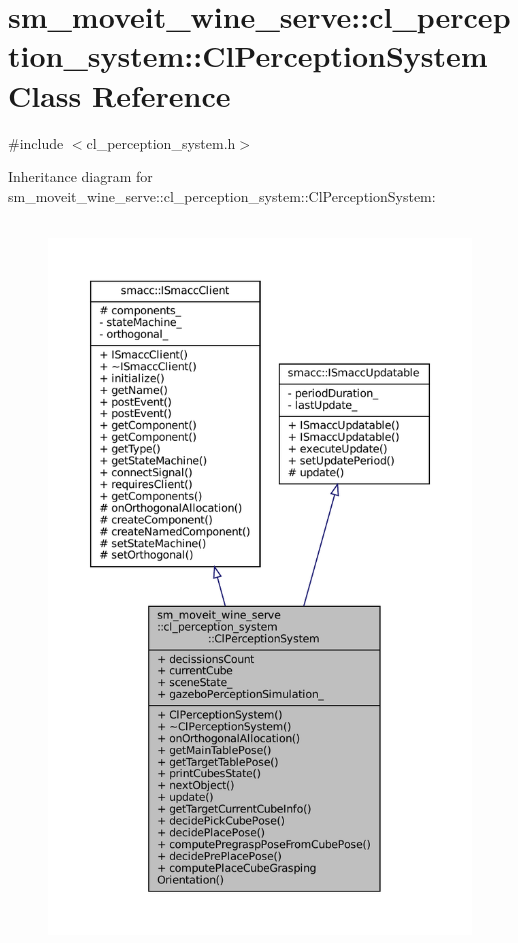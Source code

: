 \hypertarget{classsm__moveit__wine__serve_1_1cl__perception__system_1_1ClPerceptionSystem}{}\section{sm\+\_\+moveit\+\_\+wine\+\_\+serve\+:\+:cl\+\_\+perception\+\_\+system\+:\+:Cl\+Perception\+System Class Reference}
\label{classsm__moveit__wine__serve_1_1cl__perception__system_1_1ClPerceptionSystem}


{\ttfamily \#include $<$cl\+\_\+perception\+\_\+system.\+h$>$}



Inheritance diagram for sm\+\_\+moveit\+\_\+wine\+\_\+serve\+:\+:cl\+\_\+perception\+\_\+system\+:\+:Cl\+Perception\+System\+:
\nopagebreak
\begin{figure}[H]
\begin{center}
\leavevmode
\includegraphics[height=550pt]{classsm__moveit__wine__serve_1_1cl__perception__system_1_1ClPerceptionSystem__inherit__graph}
\end{center}
\end{figure}


